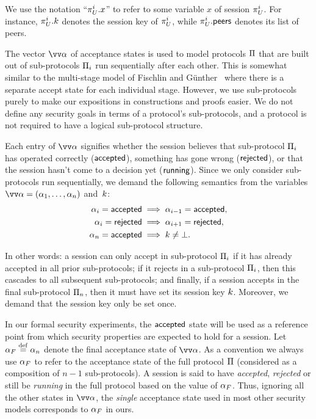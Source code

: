 We use the notation ``$\oracle[U][i].x$'' to refer to some variable $x$ of session $\oracle[U][i]$.
For instance,
$\oracle[U][i].\key$ denotes the session key of $\oracle[U][i]$,
while $\oracle[U][i].\peers$ denotes its list of peers.



The vector $\vrunstate$ of acceptance states is used to model protocols $\mathrm{\Pi}$ that are built out of sub-protocols $\mathrm{\Pi}_i$ run sequentially after each other.
This is somewhat similar to the multi-stage model of Fischlin and Günther~\cite{CCS:FisGue14} where there is a separate accept state for each individual stage.
However,
we use sub-protocols purely to make our expositions in constructions and proofs easier.
We do not define any security goals in terms of a protocol's sub-protocols,
and a protocol is not required to have a logical sub-protocol structure.


Each entry of $\vrunstate$ signifies whether the session believes that sub-protocol $\mathrm{\Pi}_i$ has operated correctly
($\mathsf{accepted}$),
something has gone wrong ($\mathsf{rejected}$),
or that the session hasn't come to a decision yet ($\mathsf{running}$).
Since we only consider sub-protocols run sequentially,
we demand the following semantics from the variables $\vrunstate = (\runstate_1, \dotsc, \runstate_n)$ and~$k$:  
\begin{align}
	\alpha_i = \mathsf{accepted} &\implies \alpha_{i-1} = \mathsf{accepted}, \\
	\alpha_i = \mathsf{rejected} &\implies \alpha_{i+1} = \mathsf{rejected}, \label{eq:runstate:reject_consistency} \\
	\alpha_n = \mathsf{accepted} &\implies k \neq \bot . \label{eq:runstate:accepted_implies_k} 
\end{align}


In other words:
a session can only accept in sub-protocol $\mathrm{\Pi}_i$ if it has already accepted in all prior sub-protocols;
if it rejects in a sub-protocol $\mathrm{\Pi}_i$, then this cascades to all subsequent sub-protocols;
and finally,
if a session accepts in the final sub-protocol $\mathrm{\Pi}_n$,
then it must have set its session key $k$.
Moreover,
we demand that the session key only be set once.


In our formal security experiments,
the $\mathsf{accepted}$ state will be used as a reference point from which security properties are expected to hold for a session.
Let $\alpha_F \overset{\mathrm{def}}{=} \alpha_n$ denote the final acceptance state of $\vrunstate$.
As a convention we always use $\alpha_F$ to refer to the acceptance state of the full protocol $\mathrm{\Pi}$ (considered as a composition of $n-1$ sub-protocols).
A session is said to have \emph{accepted}, \emph{rejected}
or still be \emph{running} in the full protocol based on the value of $\alpha_F$.
Thus,
ignoring all the other states in $\vrunstate$,
the \emph{single} acceptance state used in most other security models corresponds to $\alpha_F$ in ours.

